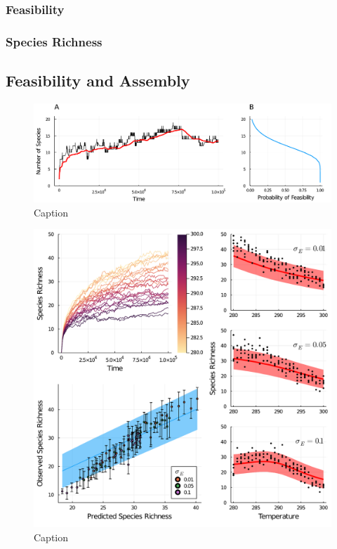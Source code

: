 \documentclass{article}
\begin{document}
\subsubsection{Feasibility}

\subsubsection{Species Richness}

\subsection{Feasibility and Assembly}

\begin{figure}
    \centering
    \includegraphics[width = \textwidth]{docs/Figures/Fig_3.pdf}
    \caption{Caption}
    \label{Fig:Assembly_Example}
\end{figure}


\begin{figure}
    \centering
    \includegraphics[width = \textwidth]{docs/Figures/Fig_4.pdf}
    \caption{Caption}
    \label{Fig:Temperature_assembly}
\end{figure}
\end{document}

